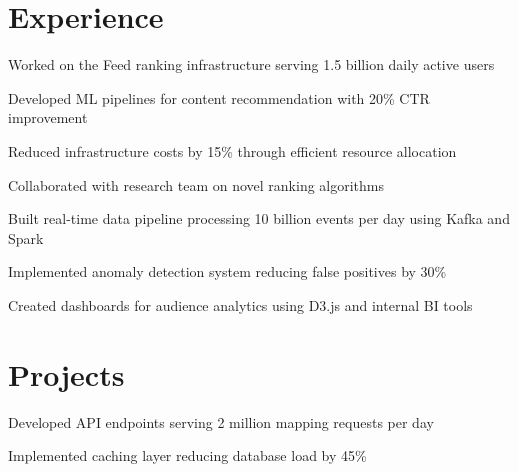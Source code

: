 \documentclass[]{deedy-resume-openfont}
\begin{document}
\begin{minipage}[t]{0.66\textwidth}

\section{Experience}

\vspace{\topsep}
\begin{tightitemize}
  \item Worked on the Feed ranking infrastructure serving 1.5 billion daily active users
  \item Developed ML pipelines for content recommendation with 20\% CTR improvement
  \item Reduced infrastructure costs by 15\% through efficient resource allocation
  \item Collaborated with research team on novel ranking algorithms
\end{tightitemize}

\sectionsep

\begin{tightitemize}
  \item Built real-time data pipeline processing 10 billion events per day using Kafka and Spark
  \item Implemented anomaly detection system reducing false positives by 30\%
  \item Created dashboards for audience analytics using D3.js and internal BI tools
\end{tightitemize}

\sectionsep

\section{Projects}

\begin{tightitemize}
  \item Developed API endpoints serving 2 million mapping requests per day
  \item Implemented caching layer reducing database load by 45\%
\end{tightitemize}

\end{minipage}
\end{document}
